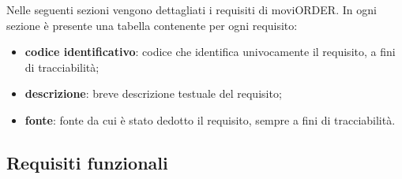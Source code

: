 Nelle seguenti sezioni vengono dettagliati i requisiti di moviORDER. In ogni sezione è presente una tabella contenente per ogni requisito:
\begin{itemize}
	\item \textbf{codice identificativo}: codice che identifica univocamente il requisito, a fini di tracciabilità;
	\item \textbf{descrizione}: breve descrizione testuale del requisito;
	\item \textbf{fonte}: fonte da cui è stato dedotto il requisito, sempre a fini di tracciabilità.
\end{itemize}

\newpage

\subsection{Requisiti funzionali}

